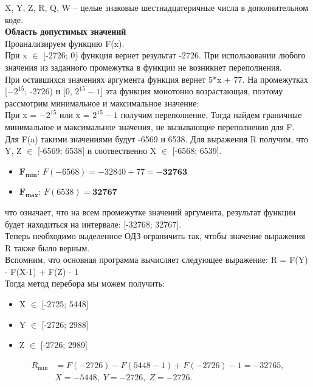 \documentclass[14pt,final,oneside]{extreport}%
\begin{document}
X, Y, Z, R, Q, W – целые знаковые шестнадцатеричные числа в дополнительном коде. \\

\textbf{Область допустимых значений} \\

Проанализируем функцию F(x). \\

При x $\in$ [-2726; 0) функция вернет результат -2726. 
При использовании любого значения из заданного промежутка в функции не возникнет переполнения. \\

При оставшихся значениях аргумента функция вернет 5*x + 77. 
На промежутках [$-2^{15}$; -2726) и [0, $2^{15}-1$] эта функция монотонно возрастающая, 
поэтому рассмотрим минимальное и максимальное значение: \\

При x = $-2^{15}$ или x = $2^{15}-1$ получим переполнение. Тогда найдем граничные минимальное и максимальное значения, не вызывающие переполнения для F. \\
Для F(a) такими значениями будут -6569 и 6538. Для выражения R получим, что Y, Z $\in$ [-6569; 6538] и соотвественно X $\in$ [-6568; 6539]. \\
\begin{itemize}
    \item $\mathbf{F_{\min}}$: $F(-6568) = -32840 + 77 = \mathbf{-32763}$
    \item $\mathbf{F_{\max}}$: $F(6538) = \mathbf{32767}$
\end{itemize}
что означает, что на всем промежутке значений аргумента, результат функции будет находиться на интервале: [-32768; 32767]. \\

Теперь необходимо выделенное ОДЗ ограничить так, чтобы значение выражения R также было верным. \\ 
Вспомним, что основная программа вычисляет следующее выражение: R = F(Y) - F(X-1) + F(Z) - 1 \\
Тогда метод перебора мы можем получить:
\begin{itemize}
    \item X $\in$ [-2725; 5448]
    \item Y $\in$ [-2726; 2988]
    \item Z $\in$ [-2726; 2989]
\end{itemize}

\[
\begin{aligned}
R_{\min} &= F(-2726) - F(5448 - 1) + F(-2726) - 1 = -32765, \\ 
& X = -5448,\; Y = -2726,\; Z = -2726.
\end{aligned}
\]
\end{document}
